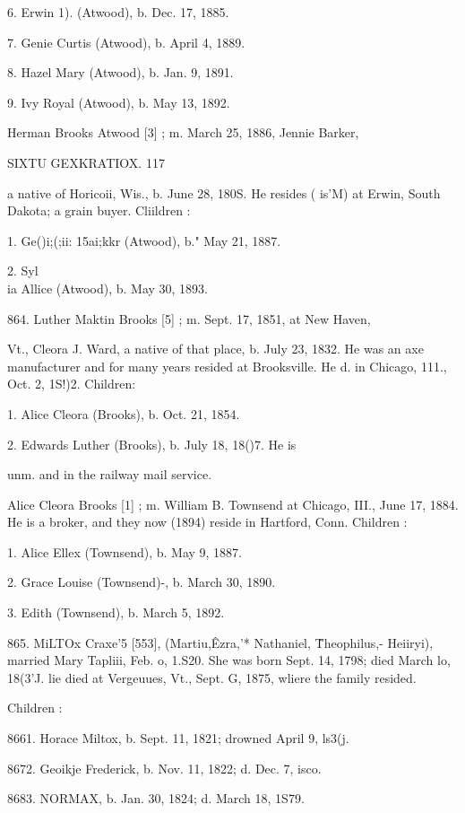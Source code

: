 6. Erwin 1). (Atwood), b. Dec. 17, 1885. 

7. Genie Curtis (Atwood), b. April 4, 1889. 

8. Hazel Mary (Atwood), b. Jan. 9, 1891. 

9. Ivy Royal (Atwood), b. May 13, 1892. 

Herman Brooks Atwood [3] ; m. March 25, 1886, Jennie Barker, 



SIXTU GEXKRATIOX. 117 

a native of Horicoii, Wis., b. June 28, 180S. He resides ( is'M) 
at Erwin, South Dakota; a grain buyer. Cliildren : 

1. Ge()i;(;ii: 15ai;kkr (Atwood), b." May 21, 1887. 

2. Syl\\ia Allice (Atwood), b. May 30, 1893. 

864. Luther Maktin Brooks [5] ; m. Sept. 17, 1851, at New Haven, 

Vt., Cleora J. Ward, a native of that place, b. July 23, 1832. 
He was an axe manufacturer and for many years resided at 
Brooksville. He d. in Chicago, 111., Oct. 2, 1S!)2. Children: 

1. Alice Cleora (Brooks), b. Oct. 21, 1854. 

2. Edwards Luther (Brooks), b. July 18, 18()7. He is 

unm. and in the railway mail service. 

Alice Cleora Brooks [1] ; m. William B. Townsend at Chicago, 
III., June 17, 1884. He is a broker, and they now (1894) reside 
in Hartford, Conn. Children : 

1. Alice Ellex (Townsend), b. May 9, 1887. 

2. Grace Louise (Townsend)-, b. March 30, 1890. 

3. Edith (Townsend), b. March 5, 1892. 

865. MiLTOx Craxe'5 [553], (Martiu,\^ Ezra,'* Nathaniel, \^ 
Theophilus,- Heiiryi), married Mary Tapliii, Feb. o, 1.S20. She 
was born Sept. 14, 1798; died March lo, 18(3'J. lie died at 
Vergeuues, Vt., Sept. G, 1875, wliere the family resided. 

Children : 

8661. Horace Miltox, b. Sept. 11, 1821; drowned April 9, ls3(j. 

8672. Geoikje Frederick, b. Nov. 11, 1822; d. Dec. 7, isco. 

8683. NORMAX, b. Jan. 30, 1824; d. March 18, 1S79. 

